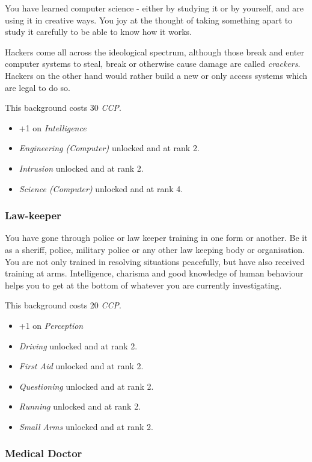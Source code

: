 You have learned computer science - either by studying it or by yourself,
and are using it in creative ways. You joy at the thought of taking something
apart to study it carefully to be able to know how it works.

Hackers come all across the ideological spectrum, although those break and
enter computer systems to steal, break or otherwise cause damage are called
\emph{crackers}. Hackers on the other hand would rather build a new or only
access systems which are legal to do so.

This background costs 30 \emph{CCP}.

\begin{itemize}
\item +1 on \emph{Intelligence}
\item \emph{Engineering (Computer)} unlocked and at rank 2.
\item \emph{Intrusion} unlocked and at rank 2.
\item \emph{Science (Computer)} unlocked and at rank 4.
\end{itemize}

\subsubsection{Law-keeper}

You have gone through police or law keeper training in one form or another. Be
it as a sheriff, police, military police or any other law keeping body or
organisation. You are not only trained in resolving situations peacefully,
but have also received training at arms. Intelligence, charisma and good
knowledge of human behaviour helps you to get at the bottom of whatever you
are currently investigating.

This background costs 20 \emph{CCP}.

\begin{itemize}
\item +1 on \emph{Perception}
\item \emph{Driving} unlocked and at rank 2.
\item \emph{First Aid} unlocked and at rank 2.
\item \emph{Questioning} unlocked and at rank 2.
\item \emph{Running} unlocked and at rank 2.
\item \emph{Small Arms} unlocked and at rank 2.
\end{itemize}

\subsubsection{Medical Doctor}

